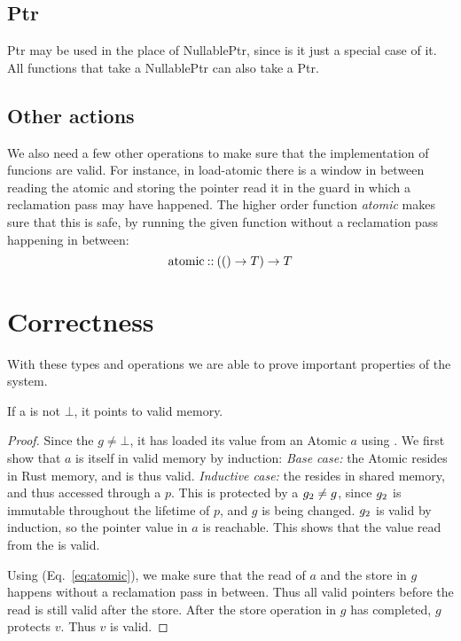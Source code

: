 \subsection{Ptr}

Ptr may be used in the place of NullablePtr, since is it just a special case of it. All functions
that take a NullablePtr can also take a Ptr.


\subsection{Other actions}

We also need a few other operations to make sure that the implementation of funcions are valid.
For instance, in load-atomic there is a window in between reading the atomic and storing the
pointer read it in the guard in which a reclamation pass may have happened. The higher order
function \emph{atomic} makes sure that this is safe, by running the given function without a
reclamation pass happening in between:
\begin{equation}\label{eq:atomic}
  \text{atomic\:::\:} (() \to T) \to T
\end{equation}


\section{Correctness}

With these types and operations we are able to prove important properties of the system.

\begin{theorem}\label{thm:guard-valid}
  If a  is not $\bot$, it points to valid memory.
\end{theorem}
\begin{proof}
  Since the  $g \neq \bot$, it has loaded its value from an Atomic $a$ using
  .  We first show that $a$ is itself in valid memory by induction: \emph{Base
  case:} the Atomic resides in Rust memory, and is thus valid. \emph{Inductive case:} the
   resides in shared memory, and thus accessed through a  $p$.  This  is
  protected by a  $g\sb{2} \neq g$, since $g\sb{2}$ is immutable throughout the lifetime
  of $p$, and $g$ is being changed. $g\sb{2}$ is valid by induction, so the pointer value in $a$ is
  reachable. This shows that the value read from the  is valid.

  Using  (Eq.~\ref{eq:atomic}), we make sure that the read of $a$ and the store in
  $g$ happens without a reclamation pass in between. Thus all valid pointers before the read is
  still valid after the store. After the store operation in $g$ has completed, $g$ protects $v$.
  Thus $v$ is valid.
\end{proof}

